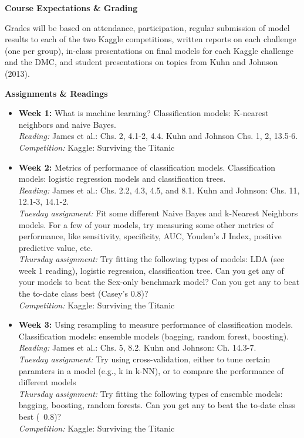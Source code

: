 \documentclass[11pt,oneside]{amsart}
\newcommand{\header}[1]{\bigbreak\textbf{#1}}
\begin{document}
\header{Course Expectations \& Grading}

Grades will be based on attendance, participation, regular submission
of model results to each of the two Kaggle competitions, written reports on
each challenge (one per group), in-class presentations on final
models for each Kaggle challenge and the DMC, and student presentations on topics from
Kuhn and Johnson (2013).

\header{Assignments \& Readings}

\begin{itemize}
\item \textbf{Week 1:} What is machine learning? Classification models: K-nearest neighbors
  and naive Bayes.\\
\emph{Reading:} James et al.: Chs. 2, 4.1-2, 4.4. Kuhn and Johnson
Chs. 1, 2, 13.5-6.\\
\emph{Competition:} Kaggle: Surviving the Titanic

\item \textbf{Week 2:} Metrics of performance of classification
  models. Classification models: logistic regression models and
  classification trees.\\
\emph{Reading:} James et al.: Chs. 2.2, 4.3, 4.5, and 8.1. Kuhn and
Johnson: Chs. 11, 12.1-3, 14.1-2.\\
\emph{Tuesday assignment:} Fit some different Naive Bayes and k-Nearest Neighbors models. For a few of your models, try measuring some other metrics of performance, like sensitivity, specificity, AUC, Youden's J Index, positive predictive value, etc.\\ 
\emph{Thursday assignment:} Try fitting the following types of models: LDA (see week 1 reading), logistic regression, classification tree. Can you get any of your models to beat the Sex-only benchmark model? Can you get any to beat the to-date class best (Casey's 0.8)?\\
\emph{Competition:} Kaggle: Surviving the Titanic

\item \textbf{Week 3:} Using resampling to measure performance of
  classification models. Classification models: ensemble models
  (bagging, random forest, boosting).\\
\emph{Reading:} James et al.: Chs. 5, 8.2. Kuhn and Johnson: Ch. 14.3-7.\\
\emph{Tuesday assignment:} Try using cross-validation, either to tune certain paramters in a model (e.g., k in k-NN), or to compare the performance of different models\\ 
\emph{Thursday assignment:} Try fitting the following types of ensemble models: bagging, boosting, random forests. Can you get any to beat the to-date class best (~0.8)?\\
\emph{Competition:} Kaggle: Surviving the Titanic


\end{itemize}
\end{document}
